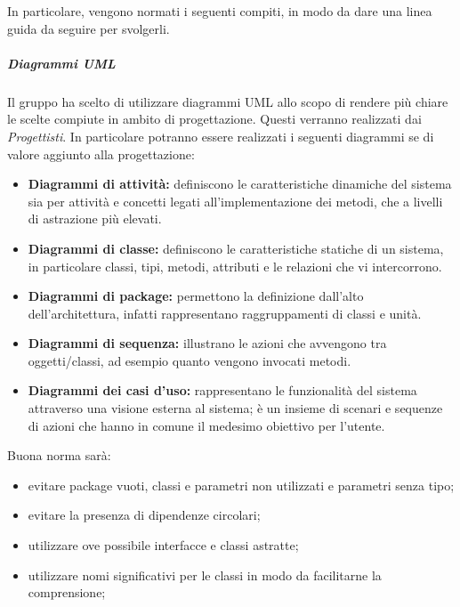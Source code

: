 In particolare, vengono normati i seguenti compiti, in modo da dare una linea guida da seguire per svolgerli.


\subparagraph{Diagrammi UML}

Il gruppo ha scelto di utilizzare diagrammi UML allo scopo di rendere più chiare le scelte compiute in ambito di
progettazione. Questi verranno realizzati dai \emph{Progettisti}. In particolare potranno essere realizzati i seguenti diagrammi se di valore aggiunto alla progettazione:
\begin{itemize}
	\item \textbf{Diagrammi di attività:} definiscono le caratteristiche dinamiche del sistema sia per attività e concetti legati all’implementazione dei metodi, che a livelli di astrazione più elevati.
	\item \textbf{Diagrammi di classe:} definiscono le caratteristiche statiche di un sistema, in particolare classi, tipi, metodi, attributi e le relazioni che vi intercorrono.
	\item \textbf{Diagrammi di package:} permettono la definizione dall'alto dell'architettura, infatti rappresentano raggruppamenti di classi e unità.
	\item \textbf{Diagrammi di sequenza:} illustrano le azioni che avvengono tra oggetti/classi, ad esempio quanto vengono invocati metodi.
	\item \textbf{Diagrammi dei casi d'uso:} rappresentano le funzionalità del sistema attraverso una visione esterna al sistema; è un insieme di scenari e sequenze di azioni che hanno in comune il medesimo obiettivo per l'utente.
\end{itemize}
Buona norma sarà:
\begin{itemize}
	\item evitare package vuoti, classi e parametri non utilizzati e parametri senza tipo;
	\item evitare la presenza di dipendenze circolari;
	\item utilizzare ove possibile interfacce e classi astratte;
	\item utilizzare nomi significativi per le classi in modo da facilitarne la comprensione;
\end{itemize}

